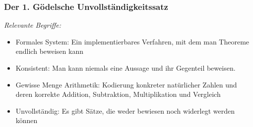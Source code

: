 \documentclass[onlymath]{beamer}
\begin{document}
\maketitle


\begin{frame}\frametitle{Der 1. Gödelsche Unvollständigkeitssatz}

\bigskip

\emph{Relevante Begriffe:}
\begin{itemize}
\item \alert{Formales System:} Ein implementierbares Verfahren, mit dem man Theoreme endlich beweisen kann
\item \alert{Konsistent:} Man kann niemals eine Aussage und ihr Gegenteil beweisen.
\item \alert{Gewisse Menge Arithmetik:} Kodierung konkreter natürlicher Zahlen und deren korrekte Addition, Subtraktion, Multiplikation und Vergleich
\item \alert{Unvollständig:} Es gibt Sätze, die weder bewiesen noch widerlegt werden können
\end{itemize}

\end{frame}
\end{document}
